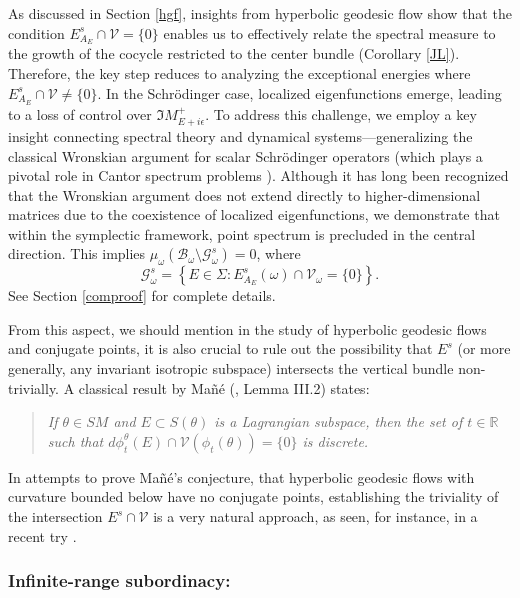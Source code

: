 \documentclass[11pt]{amsart}
\theoremstyle{remark}
\theoremstyle{definition}
\newcommand{\V}{{\mathbf V}}
\def \V{\mathcal{V}}
\begin{document}
As discussed in Section \ref{hgf}, insights from hyperbolic geodesic flow show that the condition 
$E^s_{A_E} \cap \mathcal{V} = \{0\}$ enables us to effectively relate the spectral measure 
to the growth of the cocycle restricted to the center bundle (Corollary \ref{JL}). 
Therefore, the key step reduces to analyzing the exceptional energies where 
$E^s_{A_E} \cap \mathcal{V} \neq \{0\}$. In the Schr\"odinger case, localized eigenfunctions emerge, leading to a loss of control over $\Im M^+_{E+i\epsilon}$. To address this challenge, we employ a key insight connecting spectral theory and dynamical systems—generalizing the classical Wronskian argument for scalar Schr\"odinger operators (which plays a pivotal role in Cantor spectrum problems \cite{AJ3,GJY,Puig11}). 
Although it has long been recognized that the Wronskian argument does not extend directly to higher-dimensional matrices due to the coexistence of localized eigenfunctions, we demonstrate that within the symplectic framework, point spectrum is precluded in the central direction. This implies $\mu_\omega(\mathcal{B}_\omega \setminus \mathcal{G}_\omega^s) = 0$, where 
\[
\mathcal{G}^s_\omega = \left\{ E \in \Sigma : E^s_{A_E}(\omega) \cap \mathcal{V}_\omega = \{0\} \right\}.
\]
See Section \ref{comproof} for complete details.




From this aspect, we should mention in the study of hyperbolic geodesic flows and conjugate points, it is also crucial to rule out the possibility that $E^s$ (or more generally, any invariant isotropic subspace) intersects the vertical bundle non-trivially. A classical result by Ma\~n\'e (\cite{Ma}, Lemma III.2) states:
\begin{quote}
\textit{If $\theta \in SM$ and $E \subset S(\theta)$ is a Lagrangian subspace, then the set of $t \in \mathbb{R}$ such that $d\phi_t^\theta (E) \cap \V(\phi_t(\theta)) = \{0\}$ is discrete.}
\end{quote}
In attempts to prove Ma\~n\'e's conjecture, that hyperbolic geodesic flows with curvature bounded below have no conjugate points, establishing the triviality of the intersection $E^s \cap \V$ is a very natural approach, as seen, for instance, in a recent try \cite{Se}.










\subsubsection{Infinite-range subordinacy:}
\end{document}

